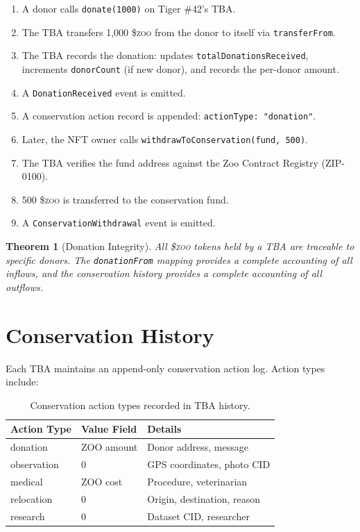 \documentclass[11pt,letterpaper]{article}
\newtheorem{theorem}{Theorem}[section]
\newcommand{\ZOO}{\$\textsc{zoo}}
\begin{document}
\begin{enumerate}
    \item A donor calls \texttt{donate(1000)} on Tiger \#42's TBA.
    \item The TBA transfers 1,000 \ZOO{} from the donor to itself via \texttt{transferFrom}.
    \item The TBA records the donation: updates \texttt{totalDonationsReceived}, increments \texttt{donorCount} (if new donor), and records the per-donor amount.
    \item A \texttt{DonationReceived} event is emitted.
    \item A conservation action record is appended: \texttt{actionType: "donation"}.
    \item Later, the NFT owner calls \texttt{withdrawToConservation(fund, 500)}.
    \item The TBA verifies the fund address against the Zoo Contract Registry (ZIP-0100).
    \item 500 \ZOO{} is transferred to the conservation fund.
    \item A \texttt{ConservationWithdrawal} event is emitted.
\end{enumerate}

\begin{theorem}[Donation Integrity]
All \ZOO{} tokens held by a TBA are traceable to specific donors. The \texttt{donationFrom} mapping provides a complete accounting of all inflows, and the conservation history provides a complete accounting of all outflows.
\end{theorem}

\section{Conservation History}
\label{sec:history}

Each TBA maintains an append-only conservation action log. Action types include:

\begin{table}[t]
\centering
\begin{tabular}{llp{5cm}}
\toprule
\textbf{Action Type} & \textbf{Value Field} & \textbf{Details} \\
\midrule
donation & ZOO amount & Donor address, message \\
observation & 0 & GPS coordinates, photo CID \\
medical & ZOO cost & Procedure, veterinarian \\
relocation & 0 & Origin, destination, reason \\
research & 0 & Dataset CID, researcher \\
\bottomrule
\end{tabular}
\caption{Conservation action types recorded in TBA history.}
\label{tab:actions}
\end{table}
\end{document}
